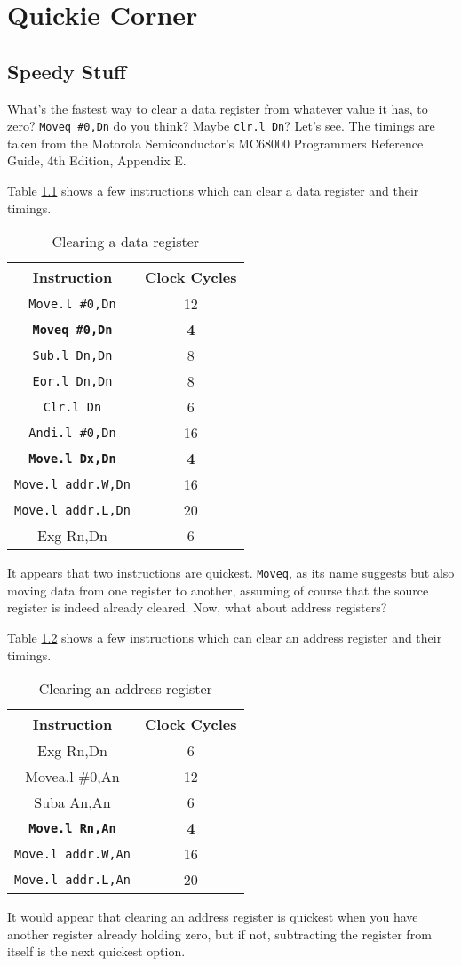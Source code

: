
\chapter{Quickie Corner}

\section{Speedy Stuff}

What's the fastest way to clear a data register from whatever value
it has, to zero? \texttt{Moveq \#0,Dn} do you think? Maybe \texttt{clr.l
Dn}? Let's see. The timings are taken from the Motorola Semiconductor's
MC68000 Programmers Reference Guide, 4th Edition, Appendix E.

Table \ref{tab:Clearing-a-data-register} shows a few instructions
which can clear a data register and their timings.

\begin{table}[!h]
\begin{centering}
\begin{tabular}{|c|c|}
\hline 
\textbf{Instruction} & \textbf{Clock Cycles}\tabularnewline
\hline 
\hline 
\texttt{Move.l \#0,Dn} & 12\tabularnewline
\hline 
\texttt{\textbf{Moveq \#0,Dn}} & \textbf{4}\tabularnewline
\hline 
\texttt{Sub.l Dn,Dn} & 8\tabularnewline
\hline 
\texttt{Eor.l Dn,Dn} & 8\tabularnewline
\hline 
\texttt{Clr.l Dn} & 6\tabularnewline
\hline 
\texttt{Andi.l \#0,Dn} & 16\tabularnewline
\hline 
\texttt{\textbf{Move.l Dx,Dn}} & \textbf{4}\tabularnewline
\hline 
\texttt{Move.l addr.W,Dn} & 16\tabularnewline
\hline 
\texttt{Move.l addr.L,Dn} & 20\tabularnewline
\hline 
Exg Rn,Dn & 6\tabularnewline
\hline 
\end{tabular}
\par\end{centering}
\caption{Clearing a data register\label{tab:Clearing-a-data-register}}

\end{table}

It appears that two instructions are quickest. \texttt{Moveq}, as
its name suggests but also moving data from one register to another,
assuming of course that the source register is indeed already cleared.
Now, what about address registers?

Table \ref{tab:Clearing-an-address-register} shows a few instructions
which can clear an address register and their timings.

\begin{table}[H]
\begin{centering}
\begin{tabular}{|c|c|}
\hline 
\textbf{Instruction} & \textbf{Clock Cycles}\tabularnewline
\hline 
\hline 
Exg Rn,Dn & 6\tabularnewline
\hline 
Movea.l \#0,An & 12\tabularnewline
\hline 
Suba An,An & 6\tabularnewline
\hline 
\texttt{\textbf{Move.l Rn,An}} & \textbf{4}\tabularnewline
\hline 
\texttt{Move.l addr.W,An} & 16\tabularnewline
\hline 
\texttt{Move.l addr.L,An} & 20\tabularnewline
\hline 
\end{tabular}
\par\end{centering}
\caption{Clearing an address register\label{tab:Clearing-an-address-register}}
\end{table}

It would appear that clearing an address register is quickest when
you have another register already holding zero, but if not, subtracting
the register from itself is the next quickest option.
